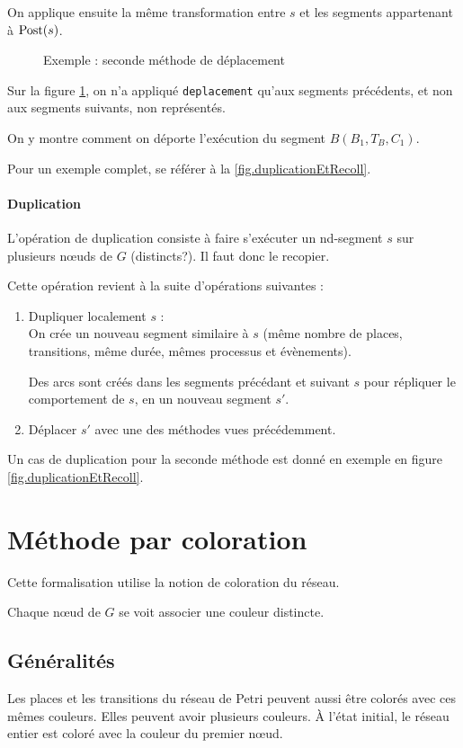 On applique ensuite la même transformation entre $s$ et les segments appartenant à $\operatorname{Post}(s)$.

\begin{figure}[H]
\centering

\caption{Exemple : seconde méthode de déplacement}
\label{fig:deplacementForm2}
\end{figure}

Sur la figure \ref{fig:deplacementForm2}, on n'a appliqué \texttt{deplacement} qu'aux segments précédents, et non aux segments suivants, non représentés.

On y montre comment on déporte l'exécution du segment $B(B_1, T_B, C_1)$.

Pour un exemple complet, se référer à la \cref{fig.duplicationEtRecoll}.

\paragraph{Duplication}
L'opération de duplication consiste à faire s'exécuter un nd-segment $s$ sur plusieurs nœuds de $G$ (distincts?). Il faut donc le recopier.

Cette opération revient à la suite d'opérations suivantes : 
\begin{enumerate}
\item Dupliquer localement $s$ : \\
		On crée un nouveau segment similaire à $s$ (même nombre de places, transitions, même durée, mêmes processus et évènements).
		
		Des arcs sont créés dans les segments précédant et suivant $s$ pour répliquer le comportement de $s$, en un nouveau segment $s'$.
\item Déplacer $s'$ avec une des méthodes vues précédemment.
\end{enumerate}

Un cas de duplication pour la seconde méthode est donné en exemple en figure \ref{fig.duplicationEtRecoll}.

\section{Méthode par coloration}
Cette formalisation utilise la notion de coloration du réseau.

Chaque nœud de $G$ se voit associer une couleur distincte.

\subsection{Généralités}
Les places et les transitions du réseau de Petri peuvent aussi être colorés avec ces mêmes couleurs. Elles peuvent avoir plusieurs couleurs.
À l'état initial, le réseau entier est coloré avec la couleur du premier nœud.

